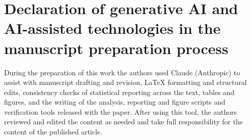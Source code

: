 \documentclass[preprint,12pt]{elsarticle}
\begin{document}
\section*{Declaration of generative AI and AI-assisted technologies in
the manuscript preparation process}

During the preparation of this work the authors used Claude (Anthropic) to
assist with manuscript drafting and revision, LaTeX formatting and structural
edits, consistency checks of statistical reporting across the text, tables and
figures, and the writing of the analysis, reporting and figure scripts and
verification tools released with the paper. After using this tool, the authors
reviewed and edited the content as needed and take full responsibility for the
content of the published article.


\end{document}
